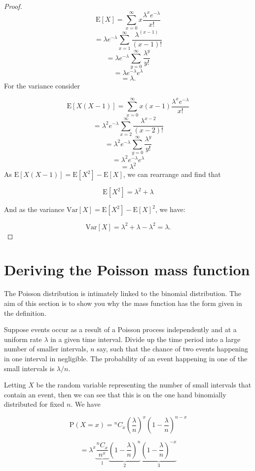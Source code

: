 \documentclass[
]{book}
\theoremstyle{definition}
\theoremstyle{definition}
\theoremstyle{definition}
\theoremstyle{definition}
\theoremstyle{remark}
\begin{document}
\begin{proof}
\[\text{E}[X] = \sum_{x=0}^{\infty}x\frac{\lambda^x e^{-\lambda}}{x!}\]
\[ =\lambda e^{-\lambda} \sum_{x=1}^{\infty}\frac{\lambda^{(x-1)}}{(x-1)!} \]
\[=\lambda e^{-\lambda} \sum_{y=0}^{\infty}\frac{\lambda^{y}}{y!} \]
\[=\lambda e^{-\lambda} e^{\lambda}  \]
\[ = \lambda .\]
For the variance consider

\[\text{E}[X(X-1)] = \sum_{x=0}^{\infty}x(x-1)\frac{\lambda^x e^{-\lambda}}{x!}\]
\[ =\lambda^2e^{-\lambda} \sum_{x=2}^{\infty}\frac{\lambda^{x-2}}{(x-2)!}\]
\[ =\lambda^2e^{-\lambda} \sum_{y=0}^{\infty}\frac{\lambda^y}{y!}\]
\[ =\lambda^2e^{-\lambda} e^{\lambda}\]
\[ =\lambda^2\]
As \(\text{E}[X(X-1)] = \text{E}[X^2] - \text{E}[X]\), we can rearrange and find that

\[\text{E}[X^2] = \lambda^2 + \lambda \]

And as the variance \(\text{Var}[X] = \text{E}[X^2] - \text{E}[X]^2\), we have:

\[\text{Var}[X] = \lambda^2 + \lambda - \lambda ^2 = \lambda .\]
\end{proof}

\hypertarget{deriving-the-poisson-mass-function}{%
\section{Deriving the Poisson mass function}\label{deriving-the-poisson-mass-function}}

The Poisson distribution is intimately linked to the binomial distribution. The aim of this section is to show you why the mass function has the form given in the definition.

Suppose events occur as a result of a Poisson process independently and at a uniform rate \(\lambda\) in a given time interval. Divide up the time period into a large number of smaller intervals, \(n\) say, such that the chance of two events happening in one interval in negligible. The probability of an event happening in one of the small intervals is \(\lambda / n\).

Letting \(X\) be the random variable representing the number of small intervals that contain an event, then we can see that this is on the one hand binomially distributed for fixed \(n\). We have

\[ \text{P}(X=x) = {}^nC_{x} \left(\frac{\lambda}{n}\right)^x \left( 1- \frac{\lambda}{n}\right)^{n-x}\]

\[ = \lambda^{x} \underbrace{\frac{^nC_{x}}{n^x}}_{1} \underbrace{\left( 1- \frac{\lambda}{n}\right)^{n}}_{2}\underbrace{\left( 1- \frac{\lambda}{n}\right)^{-x}}_{3} \]
\end{document}
